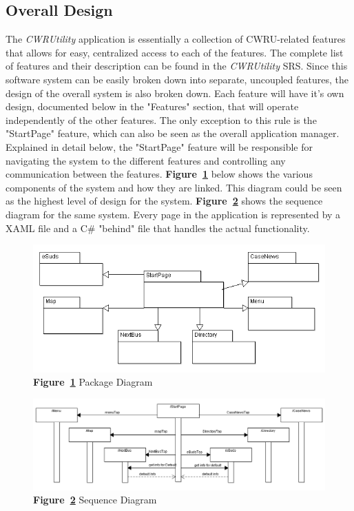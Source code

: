 \documentclass[pdftex,12pt,letter]{article}
\begin{document}
\subsection{Overall Design}
The \emph{CWRUtility} application is essentially a collection of CWRU-related features that allows for easy, centralized access to each of the features. The complete list of features and their description can be found in the \emph{CWRUtility} SRS. Since this software system can be easily broken down into separate, uncoupled features, the design of the overall system is also broken down. Each feature will have it's own design, documented below in the "Features" section, that will operate independently of the other features. The only exception to this rule is the "StartPage" feature, which can also be seen as the overall application manager. Explained in detail below, the "StartPage" feature will be responsible for navigating the system to the different features and controlling any communication between the features. \textbf{Figure~\ref{fig:overall}} below
shows the various components of the system and how they are linked. This
diagram could be seen as the highest level of design for the system. \textbf{Figure~\ref{fig:sequence}} shows the sequence diagram for the same system. Every page in the application is represented by a XAML file and a C\# "behind" file that handles
the actual functionality.
\begin{figure}[h!]
\includegraphics[width=120mm]{OverallCD.png}
\caption{\textbf{Figure~\ref{fig:overall}} Package Diagram}
\label{fig:overall}
\end{figure}
\begin{figure}[h!]
\includegraphics[width=120mm]{sequenceDia.png}
\caption{\textbf{Figure~\ref{fig:sequence}} Sequence Diagram}
\label{fig:sequence}
\end{figure}
\FloatBarrier
\end{document}

